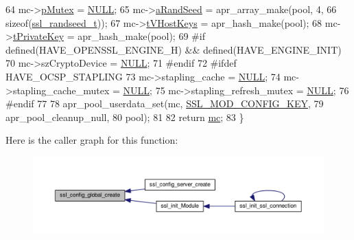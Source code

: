 \begin{DoxyCode}
64     mc->\hyperlink{structSSLModConfigRec_a98b0aeb6c70127d79a69b22d5682efb2}{pMutex}                 = \hyperlink{pcre_8txt_ad7f989d16aa8ca809a36bc392c07fba1}{NULL};
65     mc->\hyperlink{structSSLModConfigRec_a1518ea32bdea0c365a2ddc858ff3032f}{aRandSeed}              = apr\_array\_make(pool, 4,
66                                                 \textcolor{keyword}{sizeof}(\hyperlink{structssl__randseed__t}{ssl\_randseed\_t}));
67     mc->\hyperlink{structSSLModConfigRec_a9f994a465542b8d4a81381426b30069f}{tVHostKeys}             = apr\_hash\_make(pool);
68     mc->\hyperlink{structSSLModConfigRec_a6a0d1bba0a5cc5a5a9efbf59387313eb}{tPrivateKey}            = apr\_hash\_make(pool);
69 \textcolor{preprocessor}{#if defined(HAVE\_OPENSSL\_ENGINE\_H) && defined(HAVE\_ENGINE\_INIT)}
70     mc->szCryptoDevice         = \hyperlink{pcre_8txt_ad7f989d16aa8ca809a36bc392c07fba1}{NULL};
71 \textcolor{preprocessor}{#endif}
72 \textcolor{preprocessor}{#ifdef HAVE\_OCSP\_STAPLING}
73     mc->stapling\_cache         = \hyperlink{pcre_8txt_ad7f989d16aa8ca809a36bc392c07fba1}{NULL};
74     mc->stapling\_cache\_mutex   = \hyperlink{pcre_8txt_ad7f989d16aa8ca809a36bc392c07fba1}{NULL};
75     mc->stapling\_refresh\_mutex = \hyperlink{pcre_8txt_ad7f989d16aa8ca809a36bc392c07fba1}{NULL};
76 \textcolor{preprocessor}{#endif}
77 
78     apr\_pool\_userdata\_set(mc, \hyperlink{ssl__engine__config_8c_a38f1e4e69e942073bcf66d1df1fdd7f3}{SSL\_MOD\_CONFIG\_KEY},
79                           apr\_pool\_cleanup\_null,
80                           pool);
81 
82     \textcolor{keywordflow}{return} \hyperlink{group__APR__Util__MC_ga1cf8c9d89cfb411f224cae715e8c2aaa}{mc};
83 \}
\end{DoxyCode}


Here is the caller graph for this function\+:
\nopagebreak
\begin{figure}[H]
\begin{center}
\leavevmode
\includegraphics[width=350pt]{group__MOD__SSL__PRIVATE_ga0365faa903562ac63083df6d04227521_icgraph}
\end{center}
\end{figure}


